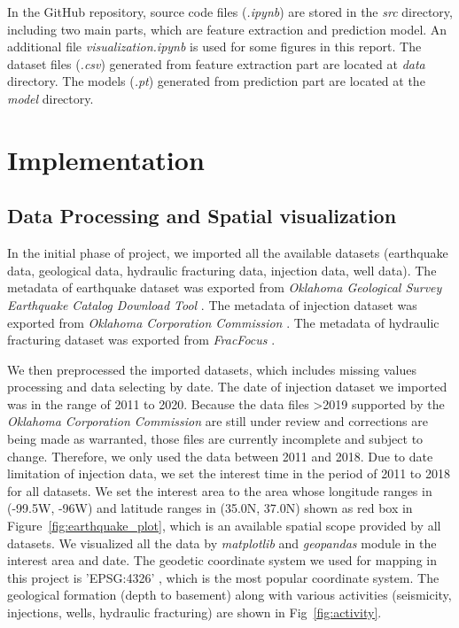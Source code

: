 \documentclass[final-report]{report-template}
\begin{document}
In the GitHub repository, source code files (\textit{.ipynb}) are stored in the \textit{src} directory, including two main parts, which are feature extraction and prediction model. An additional file \textit{visualization.ipynb} is used for some figures in this report.
The dataset files (\textit{.csv}) generated from feature extraction part are located at \textit{data} directory. The models (\textit{.pt}) generated from prediction part are located at the \textit{model} directory.

\section{Implementation}
\label{sec:Implementation}


\subsection{Data Processing and Spatial visualization}
\label{sec:dpsv}
In the initial phase of project, we imported all the available datasets (earthquake data, geological data, hydraulic fracturing data, injection data, well data).
The metadata of earthquake dataset was exported from \textit{Oklahoma Geological Survey Earthquake Catalog Download Tool} \citep{walter2020oklahoma}.
The metadata of injection dataset was exported from \textit{Oklahoma Corporation Commission} \citep{OklahomaCorporationCommission}.
The metadata of hydraulic fracturing dataset was exported from \textit{FracFocus} \citep{FracFocusChemicalDisclosureRegistry}.

We then preprocessed the imported datasets, which includes missing values processing and data selecting by date.
The date of injection dataset we imported was in the range of 2011 to 2020. Because the data files \textgreater 2019 supported by the \textit{Oklahoma Corporation Commission} are still under review and corrections are being made as warranted, those files are currently incomplete and subject to change. Therefore, we only used the data between 2011 and 2018.
Due to date limitation of injection data, we set the interest time in the period of 2011 to 2018 for all datasets.
We set the interest area to the area whose longitude ranges in (-99.5W, -96W) and latitude ranges in (35.0N, 37.0N) shown as red box in Figure~\ref{fig:earthquake_plot}, which is an available spatial scope provided by all datasets.
We visualized all the data by \textit{matplotlib} and \textit{geopandas} module in the interest area and date. The geodetic coordinate system we used for mapping in this project is 'EPSG:4326' \citep{epsg}, which is the most popular coordinate system. 
The geological formation (depth to basement) along with various activities (seismicity, injections, wells, hydraulic fracturing) are shown in Fig~\ref{fig:activity}.
\end{document}
